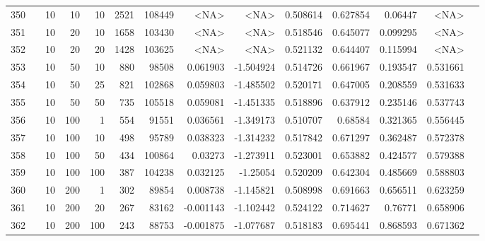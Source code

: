 \begin{longtable}{llrrrrrrrrrrrr}
		350 & &           10 &                10 &           10 &           2521 &     108449 &      <NA> &      <NA> &  0.508614 &    0.627854 &        0.06447 &  <NA> \\
		351 & &           10 &                20 &           10 &           1658 &     103430 &      <NA> &      <NA> &  0.518546 &    0.645077 &       0.099295 &  <NA> \\
		352 & &           10 &                20 &           20 &           1428 &     103625 &      <NA> &      <NA> &  0.521132 &    0.644407 &       0.115994 &  <NA> \\
		353 & &           10 &                50 &           10 &         880 &      98508 &  0.061903 & -1.504924 &  0.514726 &    0.661967 &       0.193547 &  0.531661 \\
		354 & &           10 &                50 &           25 &         821 &     102868 &  0.059803 & -1.485502 &  0.520171 &    0.647005 &       0.208559 &  0.531633 \\
		355 & &           10 &                50 &           50 &         735 &     105518 &  0.059081 & -1.451335 &  0.518896 &    0.637912 &       0.235146 &  0.537743 \\
		356 & &           10 &               100 &            1 &         554 &      91551 &  0.036561 & -1.349173 &  0.510707 &     0.68584 &       0.321365 &  0.556445 \\
		357 & &           10 &               100 &           10 &         498 &      95789 &  0.038323 & -1.314232 &  0.517842 &    0.671297 &       0.362487 &  0.572378 \\
		358 & &           10 &               100 &           50 &         434 &     100864 &   0.03273 & -1.273911 &  0.523001 &    0.653882 &       0.424577 &  0.579388 \\
		359 & &           10 &               100 &          100 &         387 &     104238 &  0.032125 &  -1.25054 &  0.520209 &    0.642304 &       0.485669 &  0.588803 \\
		360 & &           10 &               200 &            1 &         302 &      89854 &  0.008738 & -1.145821 &  0.508998 &    0.691663 &       0.656511 &  0.623259 \\
		361 & &           10 &               200 &           20 &         267 &      83162 & -0.001143 & -1.102442 &  0.524122 &    0.714627 &        0.76771 &  0.658906 \\
		362 & &           10 &               200 &          100 &         243 &      88753 & -0.001875 & -1.077687 &  0.518183 &    0.695441 &       0.868593 &  0.671362 \\

\end{longtable}
